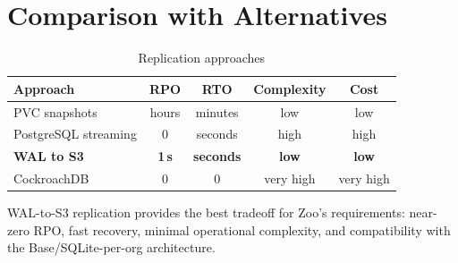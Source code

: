 \section{Comparison with Alternatives}


\begin{table}[h]
\centering
\caption{Replication approaches}
\begin{tabular}{@{}lcccc@{}}
\toprule
Approach & RPO & RTO & Complexity & Cost \\
\midrule
PVC snapshots & hours & minutes & low & low \\
PostgreSQL streaming & 0 & seconds & high & high \\
\textbf{WAL to S3} & \textbf{1\,s} & \textbf{seconds} & \textbf{low} & \textbf{low} \\
CockroachDB & 0 & 0 & very high & very high \\
\bottomrule
\end{tabular}
\end{table}

WAL-to-S3 replication provides the best tradeoff for Zoo's
requirements: near-zero RPO, fast recovery, minimal operational
complexity, and compatibility with the Base/SQLite-per-org
architecture.

